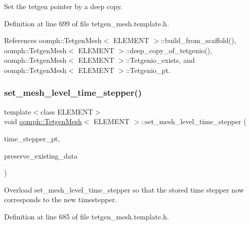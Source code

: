 Set the tetgen pointer by a deep copy. 



Definition at line 699 of file tetgen\+\_\+mesh.\+template.\+h.



References oomph\+::\+Tetgen\+Mesh$<$ E\+L\+E\+M\+E\+N\+T $>$\+::build\+\_\+from\+\_\+scaffold(), oomph\+::\+Tetgen\+Mesh$<$ E\+L\+E\+M\+E\+N\+T $>$\+::deep\+\_\+copy\+\_\+of\+\_\+tetgenio(), oomph\+::\+Tetgen\+Mesh$<$ E\+L\+E\+M\+E\+N\+T $>$\+::\+Tetgenio\+\_\+exists, and oomph\+::\+Tetgen\+Mesh$<$ E\+L\+E\+M\+E\+N\+T $>$\+::\+Tetgenio\+\_\+pt.

\mbox{\label{classoomph_1_1TetgenMesh_a9c0441ea7404e7ea404979955ffbb5dd}} 
\subsubsection{\texorpdfstring{set\+\_\+mesh\+\_\+level\+\_\+time\+\_\+stepper()}{set\_mesh\_level\_time\_stepper()}}
{\footnotesize\ttfamily template$<$class E\+L\+E\+M\+E\+NT$>$ \\
void \hyperlink{classoomph_1_1TetgenMesh}{oomph\+::\+Tetgen\+Mesh}$<$ E\+L\+E\+M\+E\+NT $>$\+::set\+\_\+mesh\+\_\+level\+\_\+time\+\_\+stepper (\begin{DoxyParamCaption}\item[{Time\+Stepper $\ast$const \&}]{time\+\_\+stepper\+\_\+pt,  }\item[{const bool \&}]{preserve\+\_\+existing\+\_\+data }\end{DoxyParamCaption})\hspace{0.3cm}{\ttfamily [inline]}}



Overload set\+\_\+mesh\+\_\+level\+\_\+time\+\_\+stepper so that the stored time stepper now corresponds to the new timestepper. 



Definition at line 685 of file tetgen\+\_\+mesh.\+template.\+h.

\mbox{\label{classoomph_1_1TetgenMesh_aeab19209f141e65511a52f195d89d6ac}} 
